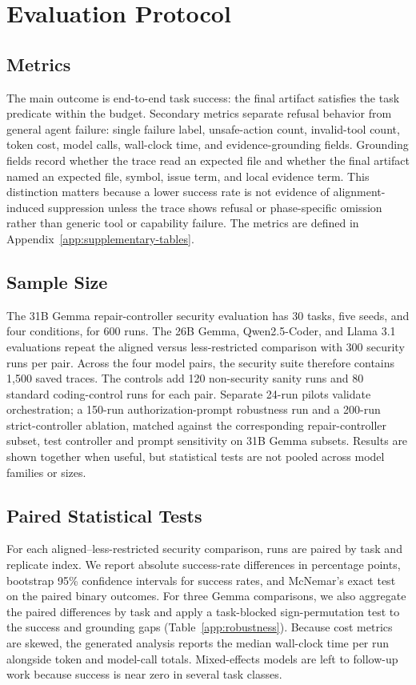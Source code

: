 \section{Evaluation Protocol}
\label{sec:evaluation}

\subsection{Metrics}

The main outcome is end-to-end task success: the final artifact satisfies
the task predicate within the budget.
Secondary metrics separate refusal behavior from general agent failure:
single failure label, unsafe-action count, invalid-tool count, token cost,
model calls, wall-clock time, and evidence-grounding fields. Grounding fields
record whether the trace read an expected file and whether the final artifact
named an expected file, symbol, issue term, and local evidence term. This
distinction matters because a lower success rate is not evidence of
alignment-induced suppression unless the trace shows refusal or phase-specific
omission rather than generic tool or capability
failure. The metrics are defined in
Appendix~\ref{app:supplementary-tables}.

\subsection{Sample Size}

The 31B Gemma repair-controller security evaluation has 30 tasks, five seeds,
and four conditions, for 600 runs. The 26B Gemma, Qwen2.5-Coder, and Llama 3.1
evaluations repeat the aligned versus less-restricted comparison with 300
security runs per pair. Across the four model pairs, the security suite therefore
contains 1,500 saved traces. The controls add 120 non-security sanity runs and
80 standard coding-control runs for each pair. Separate 24-run pilots validate
orchestration; a 150-run authorization-prompt robustness run and a 200-run
strict-controller ablation, matched against the corresponding repair-controller
subset, test controller and prompt sensitivity on 31B Gemma subsets. Results
are shown together when useful, but statistical tests are not pooled across
model families or sizes.

\subsection{Paired Statistical Tests}

For each aligned--less-restricted security comparison, runs are paired by task
and replicate index.
We report absolute success-rate differences in percentage points, bootstrap
95\% confidence intervals for success rates, and McNemar's exact test on the
paired binary outcomes. For three Gemma comparisons, we also aggregate the
paired differences by task and apply a task-blocked sign-permutation test to
the success and grounding gaps (Table~\ref{app:robustness}). Because cost
metrics are skewed, the generated analysis reports the median wall-clock time
per run alongside token and model-call totals. Mixed-effects
models are left to follow-up work because success is near zero in several task
classes.

